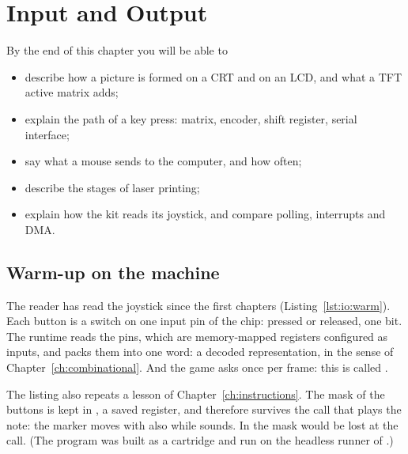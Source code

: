 \chapter{Input and Output}
\label{ch:io}


\begin{chapgoals}
By the end of this chapter you will be able to
\begin{itemize}
\item describe how a picture is formed on a CRT and on an LCD, and what a TFT active matrix adds;
\item explain the path of a key press: matrix, encoder, shift register, serial interface;
\item say what a mouse sends to the computer, and how often;
\item describe the stages of laser printing;
\item explain how the \prg kit reads its joystick, and compare polling, interrupts and DMA.
\end{itemize}
\end{chapgoals}


\section{Warm-up on the machine}


The reader has read the joystick since the first chapters
(Listing~\ref{lst:io:warm}). Each button is a switch on one input pin of the
chip: pressed or released, one bit. The runtime reads the pins, which are
memory-mapped registers configured as inputs, and packs them into one word: a
decoded representation, in the sense of Chapter~\ref{ch:combinational}. And
the game asks once per frame: this is called .

The listing also repeats a lesson of Chapter~\ref{ch:instructions}. The mask
of the buttons is kept in , a saved register, and therefore survives
the call that plays the note: the marker moves with  also while
 sounds. In  the mask would be lost at the call. (The program
was built as a cartridge and run on the headless runner of \prgqt.)

